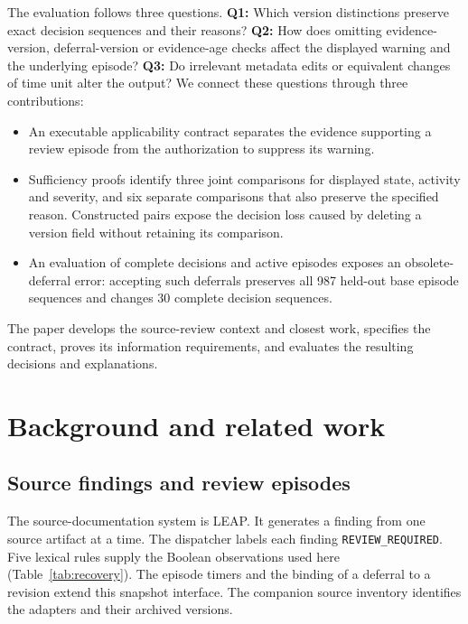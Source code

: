 \documentclass[preprint,11pt]{elsarticle}
\newcommand{\code}[1]{\texttt{#1}}
\begin{document}
The evaluation follows three questions. \textbf{Q1:} Which version distinctions preserve exact decision sequences and their reasons? \textbf{Q2:} How does omitting evidence-version, deferral-version or evidence-age checks affect the displayed warning and the underlying episode? \textbf{Q3:} Do irrelevant metadata edits or equivalent changes of time unit alter the output? We connect these questions through three contributions:
\begin{itemize}[leftmargin=*,itemsep=3pt,topsep=3pt]
\item An executable applicability contract separates the evidence supporting a review episode from the authorization to suppress its warning.
\item Sufficiency proofs identify three joint comparisons for displayed state, activity and severity, and six separate comparisons that also preserve the specified reason. Constructed pairs expose the decision loss caused by deleting a version field without retaining its comparison.
\item An evaluation of complete decisions and active episodes exposes an obsolete-deferral error: accepting such deferrals preserves all 987 held-out base episode sequences and changes 30 complete decision sequences.
\end{itemize}
The paper develops the source-review context and closest work, specifies the contract, proves its information requirements, and evaluates the resulting decisions and explanations.

\section{Background and related work}
\subsection{Source findings and review episodes}
The source-documentation system is LEAP. It generates a finding from one source artifact at a time. The dispatcher labels each finding \code{REVIEW\_REQUIRED}. Five lexical rules supply the Boolean observations used here (Table~\ref{tab:recovery}). The episode timers and the binding of a deferral to a revision extend this snapshot interface. The companion source inventory identifies the adapters and their archived versions.
\end{document}
